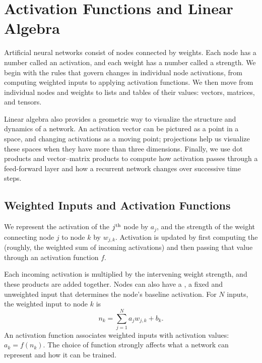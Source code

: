 \chapter{Activation Functions and Linear Algebra}\label{ch_activation_linear_algebra}

Artificial neural networks consist of nodes connected by weights. Each node has a number called an activation, and each weight has a number called a strength. We begin with the rules that govern changes in individual node activations, from computing weighted inputs to applying activation functions. We then move from individual nodes and weights to lists and tables of their values: vectors, matrices, and tensors.

Linear algebra also provides a geometric way to visualize the structure and dynamics of a network. An activation vector can be pictured as a point in a space, and changing activations as a moving point; projections help us visualize these spaces when they have more than three dimensions. Finally, we use dot products and vector--matrix products to compute how activation passes through a feed-forward layer and how a recurrent network changes over successive time steps.

\section{Weighted Inputs and Activation Functions}

We represent the activation of the $j^{\rm th}$ node by $a_j$, and the strength of the weight connecting node $j$ to node $k$ by $w_{j,k}$. Activation is updated by first computing the  (roughly, the weighted sum of incoming activations) and then passing that value through an activation function $f$.

Each incoming activation is multiplied by the intervening weight strength, and these products are added together. Nodes can also have a , a fixed and unweighted input that determines the node's baseline activation. For $N$ inputs, the weighted input to node $k$ is
\[
 n_k = \sum_{j=1}^{N} a_jw_{j,k}+b_k.
\]
An activation function associates weighted inputs with activation values: $a_k=f(n_k)$. The choice of function strongly affects what a network can represent and how it can be trained.

